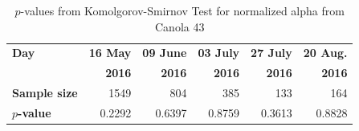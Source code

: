 \documentclass[journal]{IEEEtran}
\begin{document}

\begin{table}[hbt]
  \centering
  \caption{$p$-values from Komolgorov-Smirnov Test for normalized alpha from Canola 43}
  \label{tab:pvalues_alpha_cn43}
  \begin{tabular}{lrrrrr}
    \toprule
    \textbf{Day} & \textbf{16 May} & \textbf{09 June} & \textbf{03 July} & \textbf{27 July} & \textbf{20 Aug.}\\ 
                 & \textbf{2016} & \textbf{2016} & \textbf{2016} & \textbf{2016} & \textbf{2016}\\\midrule
    \textbf{Sample size} & 1549 & 804 & 385 & 133 & 164\\
    \textbf{$p$-value} & 0.2292 & 0.6397 & 0.8759 & 0.3613 & 0.8828\\
    \bottomrule
  \end{tabular}
\end{table}


\end{document}
